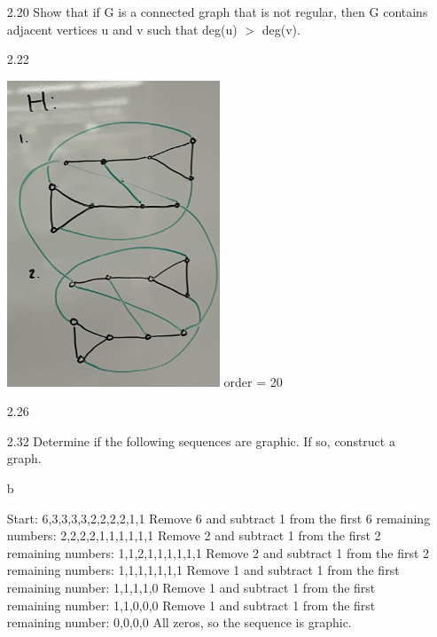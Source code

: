 \documentclass[12pt]{article}
\begin{document}
\begin{enumerate}
\item[2.20]  Show that if G is a connected graph that is not regular, then G contains adjacent vertices
 u and v such that deg(u) $>$ deg(v).

    
\item[2.22] 
\begin{center}
    \includegraphics[width=0.5\textwidth]{IMG_1782.jpg}
    order = 20
\end{center}

\item[2.26]
\item[2.32] Determine if the following sequences are graphic. If so, construct a graph.
\item[b] 

    Start: 6,3,3,3,3,2,2,2,2,1,1
    \newline
    Remove 6 and subtract 1 from the first 6 remaining numbers: 2,2,2,2,1,1,1,1,1,1
    \newline
    Remove 2 and subtract 1 from the first 2 remaining numbers: 1,1,2,1,1,1,1,1,1
    \newline
    Remove 2 and subtract 1 from the first 2 remaining numbers: 1,1,1,1,1,1,1
    \newline
    Remove 1 and subtract 1 from the first remaining number: 1,1,1,1,0
    \newline
    Remove 1 and subtract 1 from the first remaining number: 1,1,0,0,0
    \newline        
    Remove 1 and subtract 1 from the first remaining number: 0,0,0,0
    \newline
    All zeros, so the sequence is graphic.



\end{enumerate}
\end{document}
